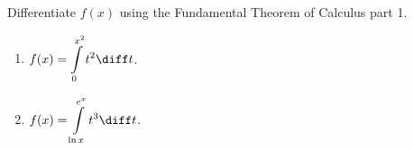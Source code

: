 Differentiate $f(x)$ using the Fundamental Theorem of Calculus part 1.
\begin{enumerate}[ref={\fcProblemRef}]
\item  $\displaystyle f(x)=\int\limits_{0}^{x^2} t^2\diff t $.

\item \label{problemd/dx(int_(ln x)^(e^x)t^3dt)} $\displaystyle f(x)=\int\limits_{\ln x}^{e^x} t^3\diff t $.



\end{enumerate}